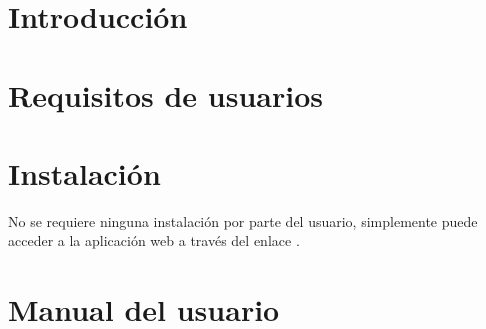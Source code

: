 
\section{Introducción}

\section{Requisitos de usuarios}

\section{Instalación}
No se requiere ninguna instalación por parte del usuario, simplemente puede acceder a la aplicación web a través del enlace \url{}.

\section{Manual del usuario}



